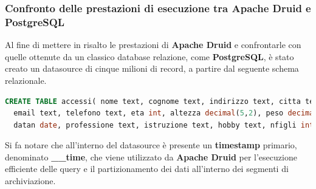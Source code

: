 \subsubsection{Confronto delle prestazioni di esecuzione tra Apache Druid e PostgreSQL}\label{sec:confronto_prestazioni1}
Al fine di mettere in risalto le prestazioni di \textbf{Apache Druid} e confrontarle con quelle ottenute da un classico database relazione, come \textbf{PostgreSQL}, è stato creato un \gls{datasource}{} di cinque milioni di record, a partire 
dal seguente schema relazionale.
\begin{lstlisting}[language=SQL]
  CREATE TABLE accessi( nome text, cognome text, indirizzo text, citta text, stato text, cap int, 
  email text, telefono text, eta int, altezza decimal(5,2), peso decimal(5,2), reddito decimal(6,2), 
  datan date, professione text, istruzione text, hobby text, nfigli int, codice_cliente int, datareg timestamp,__time timestamp)    
\end{lstlisting}
Si fa notare che all'interno del \gls{datasource}{} è presente un \textbf{timestamp} primario, denominato \textbf{\_\_time}, che viene utilizzato da \textbf{Apache Druid} per l'esecuzione 
efficiente delle query e il partizionamento dei dati all'interno dei segmenti di archiviazione.
